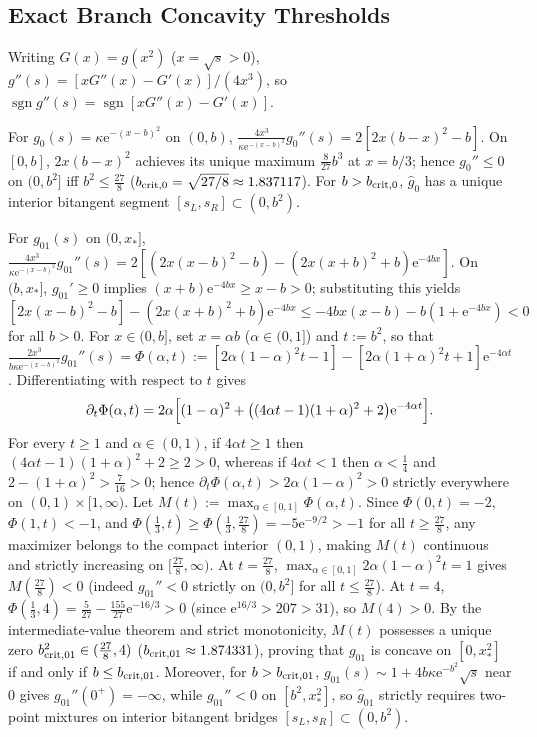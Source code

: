 \documentclass{iopjournal}
\newcommand{\sgn}{\operatorname{sgn}}
\newcommand{\ee}{\mathrm{e}}
\begin{document}
\subsection{Exact Branch Concavity Thresholds}\label{app:concavity}
Writing $G(x) = g(x^2)$ ($x = \sqrt{s} > 0$), $g''(s) = [x G''(x) - G'(x)]/(4x^3)$, so $\sgn g''(s) = \sgn[x G''(x) - G'(x)]$.

For $g_0(s) = \kappa\ee^{-(x-b)^2}$ on $(0,b)$, $\frac{4x^3}{\kappa\ee^{-(x-b)^2}}g_0''(s) = 2[2x(b-x)^2 - b]$. On $[0,b]$, $2x(b-x)^2$ achieves its unique maximum $\frac{8}{27}b^3$ at $x = b/3$; hence $g_0'' \le 0$ on $(0,b^2]$ iff $b^2 \le \frac{27}{8}$ ($b_{\rm crit,0} = \sqrt{27/8} \approx 1.837117$). For $b > b_{\rm crit,0}$, $\widehat{g}_0$ has a unique interior bitangent segment $[s_L, s_R] \subset (0, b^2)$.

For $g_{01}(s)$ on $(0, x_*]$, $\frac{4x^3}{\kappa\ee^{-(x-b)^2}}g_{01}''(s) = 2[(2x(x-b)^2 - b) - (2x(x+b)^2 + b)\ee^{-4bx}]$. On $(b, x_*]$, $g_{01}' \ge 0$ implies $(x+b)\ee^{-4bx} \ge x-b > 0$; substituting this yields $[2x(x-b)^2-b] - (2x(x+b)^2+b)\ee^{-4bx} \le -4bx(x-b) - b(1+\ee^{-4bx}) < 0$ for all $b > 0$. For $x \in (0, b]$, set $x = \alpha b$ ($\alpha \in (0,1]$) and $t := b^2$, so that $\frac{2x^3}{b\kappa\ee^{-(x-b)^2}} g_{01}''(s) = \Phi(\alpha, t) := [2\alpha(1-\alpha)^2 t - 1] - [2\alpha(1+\alpha)^2 t + 1]\ee^{-4\alpha t}$. Differentiating with respect to $t$ gives
\begin{equation*}
\partial_t \Phi(\alpha, t) = 2\alpha\Bigl[(1-\alpha)^2 + \bigl((4\alpha t - 1)(1+\alpha)^2 + 2\bigr)\ee^{-4\alpha t}\Bigr].
\end{equation*}
For every $t \ge 1$ and $\alpha \in (0,1)$, if $4\alpha t \ge 1$ then $(4\alpha t - 1)(1+\alpha)^2 + 2 \ge 2 > 0$, whereas if $4\alpha t < 1$ then $\alpha < \frac{1}{4}$ and $2 - (1+\alpha)^2 > \frac{7}{16} > 0$; hence $\partial_t\Phi(\alpha,t) > 2\alpha(1-\alpha)^2 > 0$ strictly everywhere on $(0,1) \times [1,\infty)$. Let $M(t) := \max_{\alpha \in [0,1]} \Phi(\alpha, t)$. Since $\Phi(0,t) = -2$, $\Phi(1,t) < -1$, and $\Phi(\frac{1}{3},t) \ge \Phi(\frac{1}{3},\frac{27}{8}) = -5\ee^{-9/2} > -1$ for all $t \ge \frac{27}{8}$, any maximizer belongs to the compact interior $(0,1)$, making $M(t)$ continuous and strictly increasing on $[\frac{27}{8},\infty)$. At $t = \frac{27}{8}$, $\max_{\alpha\in[0,1]} 2\alpha(1-\alpha)^2 t = 1$ gives $M(\frac{27}{8}) < 0$ (indeed $g_{01}'' < 0$ strictly on $(0, b^2]$ for all $t \le \frac{27}{8}$). At $t = 4$, $\Phi(\frac{1}{3}, 4) = \frac{5}{27} - \frac{155}{27}\ee^{-16/3} > 0$ (since $\ee^{16/3} > 207 > 31$), so $M(4) > 0$. By the intermediate-value theorem and strict monotonicity, $M(t)$ possesses a unique zero $b_{\rm crit,01}^2 \in (\frac{27}{8}, 4)$ ($b_{\rm crit,01} \approx 1.874331$), proving that $g_{01}$ is concave on $[0, x_*^2]$ if and only if $b \le b_{\rm crit,01}$. Moreover, for $b > b_{\rm crit,01}$, $g_{01}(s) \sim 1 + 4b\kappa\ee^{-b^2}\sqrt{s}$ near $0$ gives $g_{01}''(0^+) = -\infty$, while $g_{01}'' < 0$ on $[b^2, x_*^2]$, so $\widehat{g}_{01}$ strictly requires two-point mixtures on interior bitangent bridges $[s_L, s_R] \subset (0, b^2)$.
\end{document}
